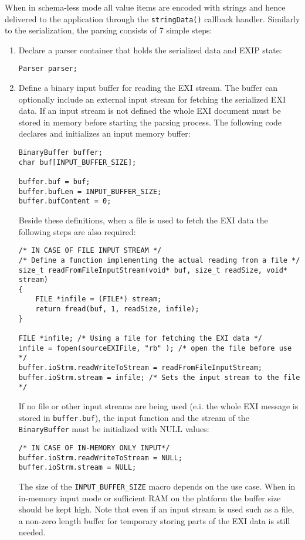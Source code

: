 When in schema-less mode all value items are encoded with strings and hence
delivered to the application through the \texttt{stringData()} callback handler.
Similarly to the serialization, the parsing consists of 7 simple steps:
\begin{enumerate}
 \item Declare a parser container that holds the serialized data and EXIP state:
\begin{lstlisting}
Parser parser;
\end{lstlisting}

 \item Define a binary input buffer for reading the EXI stream.
The buffer can optionally include an external input stream for fetching the
serialized EXI data. If an input stream is not defined the whole EXI
document must be stored in memory before starting the
parsing process. The following code declares and initializes an input memory buffer:
\begin{lstlisting}
BinaryBuffer buffer;
char buf[INPUT_BUFFER_SIZE];

buffer.buf = buf;
buffer.bufLen = INPUT_BUFFER_SIZE;
buffer.bufContent = 0;
\end{lstlisting}
Beside these definitions, when a file is used to fetch the
EXI data the following steps are also required: 
\begin{lstlisting}
/* IN CASE OF FILE INPUT STREAM */
/* Define a function implementing the actual reading from a file */
size_t readFromFileInputStream(void* buf, size_t readSize, void* stream)
{
	FILE *infile = (FILE*) stream;
	return fread(buf, 1, readSize, infile);
}

FILE *infile; /* Using a file for fetching the EXI data */
infile = fopen(sourceEXIFile, "rb" ); /* open the file before use */
buffer.ioStrm.readWriteToStream = readFromFileInputStream;
buffer.ioStrm.stream = infile; /* Sets the input stream to the file */
\end{lstlisting}
If no file or other input streams are being used (e.i. the whole EXI message is
stored in \texttt{buffer.buf}), the input function and the stream
of the \texttt{BinaryBuffer} must be initialized with NULL values:
\begin{lstlisting}
/* IN CASE OF IN-MEMORY ONLY INPUT*/
buffer.ioStrm.readWriteToStream = NULL;
buffer.ioStrm.stream = NULL;
\end{lstlisting}

The size of the \texttt{INPUT\_BUFFER\_SIZE} macro depends on the
use case. When in in-memory input mode or sufficient RAM on the
platform the buffer size should be kept high. Note that even if
an input stream is used such as a file, a non-zero length buffer
for temporary storing parts of the EXI data is still needed.


\end{enumerate}
